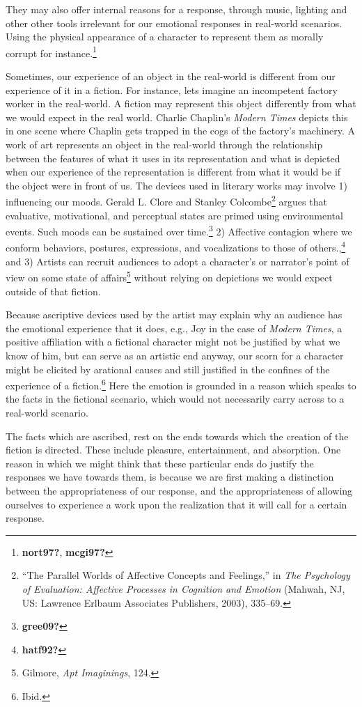 \documentclass[phdthesis,12pt,final]{wuthesis}
\theoremstyle{definition}
\theoremstyle{definition}
\theoremstyle{definition}
\theoremstyle{definition}
\theoremstyle{remark}
\begin{document}
They may also offer internal reasons for a response, through music, lighting and other other tools irrelevant for our emotional responses in real-world scenarios. Using the physical appearance of a character to represent them as morally corrupt for instance.\footnote{\textbf{nort97?}, \textbf{mcgi97?}}

Sometimes, our experience of an object in the real-world is different from our experience of it in a fiction. For instance, lets imagine an incompetent factory worker in the real-world. A fiction may represent this object differently from what we would expect in the real world. Charlie Chaplin's \emph{Modern Times} depicts this in one scene where Chaplin gets trapped in the cogs of the factory's machinery. A work of art represents an object in the real-world through the relationship between the features of what it uses in its representation and what is depicted when our experience of the representation is different from what it would be if the object were in front of us. The devices used in literary works may involve 1) influencing our moods. Gerald L. Clore and Stanley Colcombe\footnote{{``The Parallel Worlds of Affective Concepts and Feelings,''} in \emph{The Psychology of Evaluation: {Affective} Processes in Cognition and Emotion} (Mahwah, NJ, US: Lawrence Erlbaum Associates Publishers, 2003), 335--69.} argues that evaluative, motivational, and perceptual states are primed using environmental events. Such moods can be sustained over time.\footnote{\textbf{gree09?}} 2) Affective contagion where we conform behaviors, postures, expressions, and vocalizations to those of others.,\footnote{\textbf{hatf92?}} and 3) Artists can recruit audiences to adopt a character's or narrator's point of view on some state of affairs\footnote{Gilmore, \emph{Apt {Imaginings}}, 124.} without relying on depictions we would expect outside of that fiction.

Because ascriptive devices used by the artist may explain why an audience has the emotional experience that it does, e.g., Joy in the case of \emph{Modern Times}, a positive affiliation with a fictional character might not be justified by what we know of him, but can serve as an artistic end anyway, our scorn for a character might be elicited by arational causes and still justified in the confines of the experience of a fiction.\footnote{Ibid.} Here the emotion is grounded in a reason which speaks to the facts in the fictional scenario, which would not necessarily carry across to a real-world scenario.

The facts which are ascribed, rest on the ends towards which the creation of the fiction is directed. These include pleasure, entertainment, and absorption. One reason in which we might think that these particular ends do justify the responses we have towards them, is because we are first making a distinction between the appropriateness of our response, and the appropriateness of allowing ourselves to experience a work upon the realization that it will call for a certain response.
\end{document}
